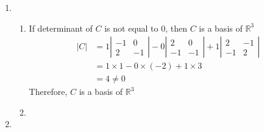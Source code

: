 \documentclass[12pt]{article}
\begin{document}
\begin{enumerate}[label=\alph*.]
                \item 
                    \begin{enumerate}[label=(\roman*)]
                        \item If determinant of $C$ is not equal to 0, then $C$ is a basis of $\mathbb{R}^3$
                            \begin{align*}
                                |C|&=1\left|\begin{matrix}
                                    -1 & 0\\
                                    2 & -1
                                \end{matrix}\right|
                                - 0\left|\begin{matrix}
                                     2 & 0\\
                                    -1 & -1
                                \end{matrix}\right|
                                + 1\left|\begin{matrix}
                                     2 & -1\\
                                    -1 &  2
                                \end{matrix}\right|\\
                                &= 1\times 1 - 0 \times (-2) + 1 \times 3\\
                                &=4 \neq 0
                            \end{align*}
                            Therefore, $C$ is a basis of $\mathbb{R}^3$
                        \item 
                    \end{enumerate}
                \item 
            \end{enumerate}
\end{document}
